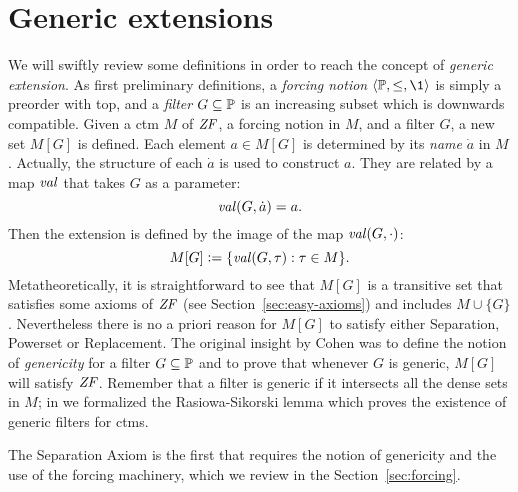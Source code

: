 \section{Generic extensions}
\label{sec:generic-extensions}
We will swiftly review some definitions in order to reach the concept
of \emph{generic extension}. As first preliminary definitions, a \emph{forcing
notion} $\lb\PP,\leq,\1\rb$ is simply a preorder with top, and a \emph{filter}
$G\subseteq\mathbb{P}$ is an increasing subset which is downwards
compatible. Given a ctm $M$ of $\mathit{ZF}$, a forcing
notion in $M$, and a filter $G$, a new set $M[G]$ is defined. Each
element $a\in M[G]$ is 
determined by its \emph{name} $\dot a$ in $M$. Actually, the structure of
each $\dot a$ is used to construct $a$. They are related by a
map $\operatorname{\mathit{val}}$ that takes $G$ as a parameter:
\[
\operatorname{\mathit{val}}(G,\dot a) = a.
\] 
Then the extension is defined by the image of the map $\operatorname{\mathit{val}}(G,\cdot)$:
\[
M[G] \mathrel{\mathop:}= \{\operatorname{\mathit{val}}(G,\tau): \tau\in M\}.
\]
Metatheoretically, it is straightforward to see that $M[G]$ is a
transitive set that satisfies some axioms of $\mathit{ZF}$ (see
Section~\ref{sec:easy-axioms}) and includes $M\cup\{G\}$. Nevertheless
there is no a priori reason for $M[G]$ to satisfy either Separation, Powerset
or Replacement. The original insight by Cohen was to define the notion
of \emph{genericity} for a filter $G\subseteq\mathbb{P}$ and to prove that
whenever $G$ is generic, $M[G]$ will satisfy $\mathit{ZF}$. Remember that a
filter is generic if it intersects all the dense sets in $M$; in
\cite{2018arXiv180705174G} we formalized the Rasiowa-Sikorski lemma which
proves the existence of generic filters for ctms.

The Separation Axiom  is the first that requires the notion of
genericity and the use of the forcing machinery, which we review in
the Section~\ref{sec:forcing}.


